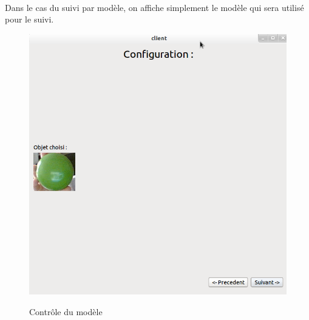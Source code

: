 \documentclass{report}
\begin{document}
				\paragraph{}
				Dans le cas du suivi par modèle, on affiche simplement le modèle qui sera utilisé pour le suivi.
				\begin{figure}[!h]
						\centering
						\includegraphics[scale=0.35]{../images/Capture7.png}\\
						\caption{Contrôle du modèle}
						\label{Contrôle du modèle}
				\end{figure}
				\newpage
\end{document}
